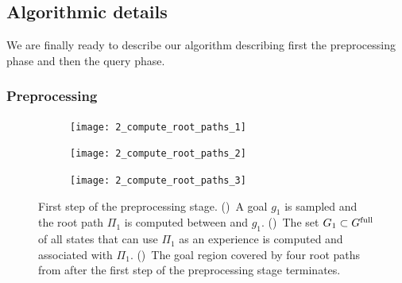 \documentclass[a4paper]{report}
\begin{document}
\subsection{Algorithmic details}
We are finally ready to describe our algorithm describing first the preprocessing phase and then  the query phase.

\subsubsection{Preprocessing}
\begin{figure}[t]
    \centering
    \begin{subfigure}{.47\textwidth}
        \texttt{[image: 2\_compute\_root\_paths\_1]}
        \caption{}
        \label{fig:crp1}
    \end{subfigure}
    \hspace{4mm}
    \begin{subfigure}{0.47\textwidth}
        \texttt{[image: 2\_compute\_root\_paths\_2]}
        \caption{}
        \label{fig:crp2}
    \end{subfigure}
    \hspace{4mm}
    \begin{subfigure}{0.48\textwidth}
        \texttt{[image: 2\_compute\_root\_paths\_3]}
        \caption{}
        \label{fig:crp3}
    \end{subfigure}
    \caption{\CaptionTextSize
    First step of the preprocessing stage.
    ()~A goal $g_1$ is sampled and the root path $\Pi_1$ is computed between \Shome and $g_1$.
    ()~The set $G_1 \subset G^{\textrm{full}}$ of all states that can use $\Pi_1$ as an experience is computed and associated with $\Pi_1$.
    ()~The goal region covered by four root paths from \Shome after the first step of the preprocessing stage terminates.
    }
    \label{fig:crp}
\end{figure}
\end{document}
